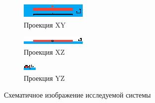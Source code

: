 \begin{figure}[h]

	\begin{subfigure}[b]{\textwidth}
		\centering
		\includegraphics[width=\textwidth]{img/scheme_xy3}
		\caption{Проекция XY}
		\label{fig:scheme_xy}
	\end{subfigure}
	\begin{subfigure}[b]{\textwidth}
		\centering
		\includegraphics[width=\textwidth]{img/scheme_xz}
		\caption{Проекция XZ}
		\label{fig:scheme_xz}
	\end{subfigure}
	\begin{subfigure}[b]{\textwidth}
		\centering
		\includegraphics[width=.7\textwidth]{img/scheme_yz3}
		\caption{Проекция YZ}
		\label{fig:scheme_yz}
	\end{subfigure}
	\caption{Схематичное изображение исследуемой системы}
	\label{fig:scheme}

\end{figure}